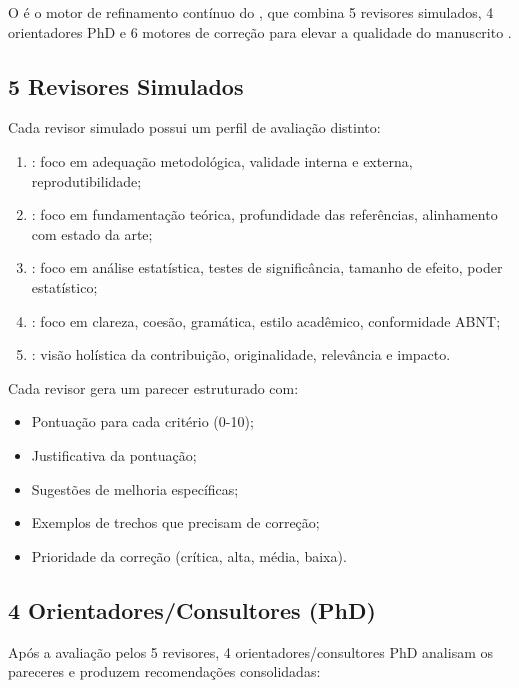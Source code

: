 O  é o motor de refinamento contínuo do
\opencodeeco{}, que combina 5 revisores simulados, 4 orientadores PhD e
6 motores de correção para elevar a qualidade do manuscrito
\cite{opencode2026ecosystem, opencode2026maswos}.

\subsection{5 Revisores Simulados}

Cada revisor simulado possui um perfil de avaliação distinto:

\begin{enumerate}
\item {}: foco em adequação metodológica,
      validade interna e externa, reprodutibilidade;
\item {}: foco em fundamentação teórica, profundidade
      das referências, alinhamento com estado da arte;
\item {}: foco em análise estatística, testes de
      significância, tamanho de efeito, poder estatístico;
\item {}: foco em clareza, coesão, gramática, estilo
      acadêmico, conformidade ABNT;
\item {}: visão holística da contribuição, originalidade,
      relevância e impacto.
\end{enumerate}

Cada revisor gera um parecer estruturado com:

\begin{itemize}
\item Pontuação para cada critério (0-10);
\item Justificativa da pontuação;
\item Sugestões de melhoria específicas;
\item Exemplos de trechos que precisam de correção;
\item Prioridade da correção (crítica, alta, média, baixa).
\end{itemize}

\subsection{4 Orientadores/Consultores (PhD)}

Após a avaliação pelos 5 revisores, 4 orientadores/consultores PhD analisam
os pareceres e produzem recomendações consolidadas:

